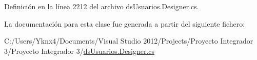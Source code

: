 Definición en la línea 2212 del archivo ds\-Usuarios.\-Designer.\-cs.



La documentación para esta clase fue generada a partir del siguiente fichero\-:\begin{DoxyCompactItemize}
\item 
C\-:/\-Users/\-Yknx4/\-Documents/\-Visual Studio 2012/\-Projects/\-Proyecto Integrador 3/\-Proyecto Integrador 3/\hyperlink{ds_usuarios_8_designer_8cs}{ds\-Usuarios.\-Designer.\-cs}\end{DoxyCompactItemize}
